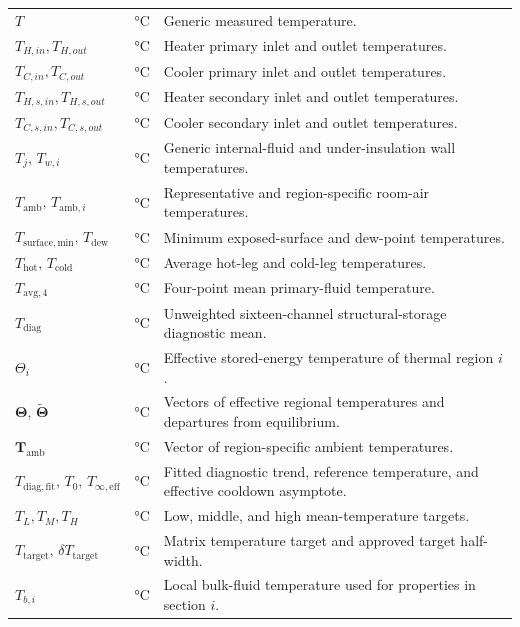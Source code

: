 \documentclass[11pt]{article}
\newcommand{\Tavg}{T_{\mathrm{avg},4}}
\newcommand{\Tdiag}{T_{\mathrm{diag}}}
\newcommand{\Thot}{T_{\mathrm{hot}}}
\newcommand{\Tcold}{T_{\mathrm{cold}}}
\newcommand{\Tamb}{T_{\mathrm{amb}}}
\begin{document}
\begin{longtable}{@{}>{\raggedright\arraybackslash}p{1.62in}>{\raggedright\arraybackslash}p{1.12in}>{\raggedright\arraybackslash}p{3.76in}@{}}
$T$ & \si{\degreeCelsius} & Generic measured temperature. \\
$T_{H,in},T_{H,out}$ & \si{\degreeCelsius} & Heater primary inlet and outlet temperatures. \\
$T_{C,in},T_{C,out}$ & \si{\degreeCelsius} & Cooler primary inlet and outlet temperatures. \\
$T_{H,s,in},T_{H,s,out}$ & \si{\degreeCelsius} & Heater secondary inlet and outlet temperatures. \\
$T_{C,s,in},T_{C,s,out}$ & \si{\degreeCelsius} & Cooler secondary inlet and outlet temperatures. \\
$T_j,\,T_{w,i}$ & \si{\degreeCelsius} & Generic internal-fluid and under-insulation wall temperatures. \\
$\Tamb,\,T_{\mathrm{amb},i}$ & \si{\degreeCelsius} & Representative and region-specific room-air temperatures. \\
$T_{\mathrm{surface,min}},\,T_{\mathrm{dew}}$ & \si{\degreeCelsius} & Minimum exposed-surface and dew-point temperatures. \\
$\Thot,\,\Tcold$ & \si{\degreeCelsius} & Average hot-leg and cold-leg temperatures. \\
$\Tavg$ & \si{\degreeCelsius} & Four-point mean primary-fluid temperature. \\
$\Tdiag$ & \si{\degreeCelsius} & Unweighted sixteen-channel structural-storage diagnostic mean. \\
$\Theta_i$ & \si{\degreeCelsius} & Effective stored-energy temperature of thermal region $i$. \\
$\boldsymbol\Theta,\,\widetilde{\boldsymbol\Theta}$ & \si{\degreeCelsius} & Vectors of effective regional temperatures and departures from equilibrium. \\
$\mathbf T_{\mathrm{amb}}$ & \si{\degreeCelsius} & Vector of region-specific ambient temperatures. \\
$T_{\mathrm{diag,fit}},\,T_0,\,T_{\infty,\mathrm{eff}}$ & \si{\degreeCelsius} & Fitted diagnostic trend, reference temperature, and effective cooldown asymptote. \\
$T_L,T_M,T_H$ & \si{\degreeCelsius} & Low, middle, and high mean-temperature targets. \\
$T_{\mathrm{target}},\,\delta T_{\mathrm{target}}$ & \si{\degreeCelsius} & Matrix temperature target and approved target half-width. \\
$T_{b,i}$ & \si{\degreeCelsius} & Local bulk-fluid temperature used for properties in section $i$. \\

\end{longtable}
\end{document}
